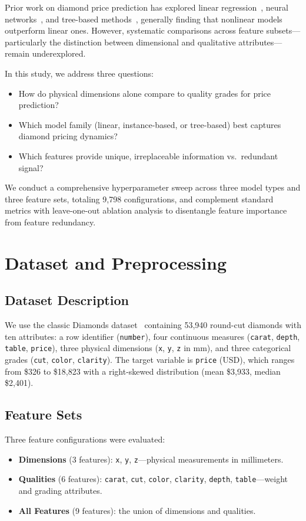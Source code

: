 \documentclass[conference]{IEEEtran}
\begin{document}
Prior work on diamond price prediction has explored linear regression~\cite{b2}, neural networks~\cite{b3}, and tree-based methods~\cite{b4}, generally finding that nonlinear models outperform linear ones. However, systematic comparisons across feature subsets---particularly the distinction between dimensional and qualitative attributes---remain underexplored.

In this study, we address three questions:
\begin{itemize}
\item How do physical dimensions alone compare to quality grades for price prediction?
\item Which model family (linear, instance-based, or tree-based) best captures diamond pricing dynamics?
\item Which features provide unique, irreplaceable information vs.\ redundant signal?
\end{itemize}

We conduct a comprehensive hyperparameter sweep across three model types and three feature sets, totaling 9,798 configurations, and complement standard metrics with leave-one-out ablation analysis to disentangle feature importance from feature redundancy.

\section{Dataset and Preprocessing}

\subsection{Dataset Description}
We use the classic Diamonds dataset~\cite{b5} containing 53,940 round-cut diamonds with ten attributes: a row identifier (\texttt{number}), four continuous measures (\texttt{carat}, \texttt{depth}, \texttt{table}, \texttt{price}), three physical dimensions (\texttt{x}, \texttt{y}, \texttt{z} in mm), and three categorical grades (\texttt{cut}, \texttt{color}, \texttt{clarity}). The target variable is \texttt{price} (USD), which ranges from \$326 to \$18,823 with a right-skewed distribution (mean \$3,933, median \$2,401).

\subsection{Feature Sets}
Three feature configurations were evaluated:
\begin{itemize}
\item \textbf{Dimensions} (3 features): \texttt{x}, \texttt{y}, \texttt{z}---physical measurements in millimeters.
\item \textbf{Qualities} (6 features): \texttt{carat}, \texttt{cut}, \texttt{color}, \texttt{clarity}, \texttt{depth}, \texttt{table}---weight and grading attributes.
\item \textbf{All Features} (9 features): the union of dimensions and qualities.
\end{itemize}
\end{document}
